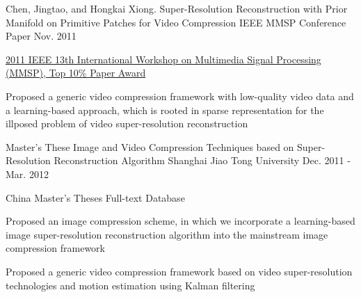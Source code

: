

\begin{cventries}

  \cventry
    {Chen, Jingtao, and Hongkai Xiong.} %
    {Super-Resolution Reconstruction with Prior Manifold on Primitive Patches for Video Compression} %
    {IEEE MMSP Conference Paper} %
    {Nov. 2011} %
    {
      \begin{cvitems} %
        \item {\href{http://ieeexplore.ieee.org/abstract/document/6093849/}{2011 IEEE 13th International Workshop on Multimedia Signal Processing (MMSP), Top 10\% Paper Award}}
        \item {Proposed a generic video compression framework with low-quality video data and a learning-based approach, which is rooted in sparse representation for the illposed problem of video super-resolution reconstruction}
      \end{cvitems}
    }

  \cventry
    {Master's These} %
    {Image and Video Compression Techniques based on Super-Resolution Reconstruction Algorithm} %
    {Shanghai Jiao Tong University} %
    {Dec. 2011 - Mar. 2012} %
    {
      \begin{cvitems} %
        \item {China Master’s Theses Full-text Database}
		\item {Proposed an image compression scheme, in which we incorporate a learning-based image super-resolution
reconstruction algorithm into the mainstream image compression framework}
		\item {Proposed a generic video compression framework based on video super-resolution technologies and motion estimation using Kalman filtering}
      \end{cvitems}
    }

\end{cventries}
